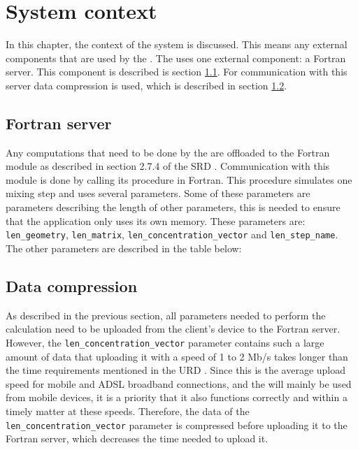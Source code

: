 \chapter{System context}
\label{chap:systcontext}
In this chapter, the context of the system is discussed. This means any external components that are used by the \applicationname{}. The \applicationname{} uses one external component: a Fortran server. This component is described is section \ref{sec:fortranserver}. For communication with this server data compression is used, which is described in section \ref{sec:datacomp}.

\section{Fortran server}
\label{sec:fortranserver}
Any computations that need to be done by the \applicationname{} are offloaded to the Fortran module as described in section 2.7.4 of the SRD \cite{srd}. Communication with this module is done by calling its procedure in Fortran. This procedure simulates one mixing step and uses several parameters. Some of these parameters are parameters describing the length of other parameters, this is needed to ensure that the application only uses its own memory. These parameters are: \texttt{len\_geometry}, \texttt{len\_matrix}, \texttt{len\_concentration\_vector} and \texttt{len\_step\_name}. The other parameters are described in the table below:

\begin{center}
\end{center}

\section{Data compression}
\label{sec:datacomp}
As described in the previous section, all parameters needed to perform the calculation need to be uploaded from the client's device to the Fortran server. However, the \texttt{len\_concentration\_vector} parameter contains such a large amount of data that uploading it with a speed of 1 to 2 Mb/s takes longer than the time requirements mentioned in the URD \cite{urd}. Since this is the average upload speed for mobile and ADSL broadband connections, and the \applicationname{} will mainly be used from mobile devices, it is a priority that it also functions correctly and within a timely matter at these speeds. Therefore, the data of the \texttt{len\_concentration\_vector} parameter is compressed before uploading it to the Fortran server, which decreases the time needed to upload it.

